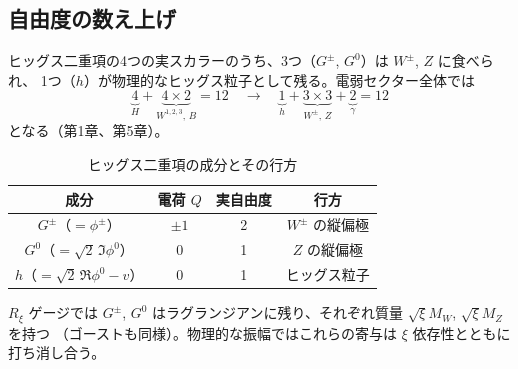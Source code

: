 \documentclass[uplatex,dvipdfmx,a4paper,11pt,openany]{jsbook}
\numberwithin{equation}{chapter}
\theoremstyle{definition}
\theoremstyle{plain}
\theoremstyle{remark}
\begin{document}
\subsection{自由度の数え上げ}
ヒッグス二重項の4つの実スカラーのうち、3つ（$G^\pm$, $G^0$）は $W^\pm$, $Z$ に食べられ、
1つ（$h$）が物理的なヒッグス粒子として残る。電弱セクター全体では
\begin{equation}
\underbrace{4}_{H}+\underbrace{4\times2}_{W^{1,2,3},\,B}=12
\quad\longrightarrow\quad
\underbrace{1}_{h}+\underbrace{3\times3}_{W^\pm,\,Z}+\underbrace{2}_{\gamma}=12
\end{equation}
となる（第1章、第5章）。
\begin{table}[htbp]
\centering
\caption{ヒッグス二重項の成分とその行方}
\label{tab:higgs-components}
\begin{tabular}{cccc}
\toprule
成分 & 電荷 $Q$ & 実自由度 & 行方\\
\midrule
$G^\pm$（$=\phi^\pm$） & $\pm1$ & 2 & $W^\pm$ の縦偏極\\
$G^0$（$=\sqrt2\,\Im\phi^0$） & $0$ & 1 & $Z$ の縦偏極\\
$h$（$=\sqrt2\,\Re\phi^0-v$） & $0$ & 1 & ヒッグス粒子\\
\bottomrule
\end{tabular}
\end{table}
$R_\xi$ ゲージでは $G^\pm$, $G^0$ はラグランジアンに残り、それぞれ質量 $\sqrt\xi M_W$, $\sqrt\xi M_Z$ を持つ
（ゴーストも同様）。物理的な振幅ではこれらの寄与は $\xi$ 依存性とともに打ち消し合う。
\end{document}
